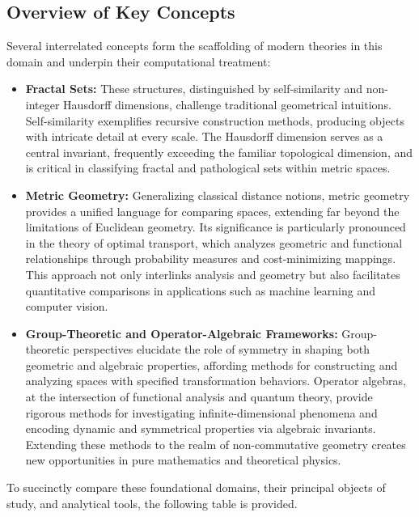 \documentclass[sigconf]{acmart}
\begin{document}
\subsection{Overview of Key Concepts}

Several interrelated concepts form the scaffolding of modern theories in this domain and underpin their computational treatment:

\begin{itemize}
    \item \textbf{Fractal Sets:} These structures, distinguished by self-similarity and non-integer Hausdorff dimensions, challenge traditional geometrical intuitions. Self-similarity exemplifies recursive construction methods, producing objects with intricate detail at every scale. The Hausdorff dimension serves as a central invariant, frequently exceeding the familiar topological dimension, and is critical in classifying fractal and pathological sets within metric spaces.
    \item \textbf{Metric Geometry:} Generalizing classical distance notions, metric geometry provides a unified language for comparing spaces, extending far beyond the limitations of Euclidean geometry. Its significance is particularly pronounced in the theory of optimal transport, which analyzes geometric and functional relationships through probability measures and cost-minimizing mappings. This approach not only interlinks analysis and geometry but also facilitates quantitative comparisons in applications such as machine learning and computer vision.
    \item \textbf{Group-Theoretic and Operator-Algebraic Frameworks:} Group-theoretic perspectives elucidate the role of symmetry in shaping both geometric and algebraic properties, affording methods for constructing and analyzing spaces with specified transformation behaviors. Operator algebras, at the intersection of functional analysis and quantum theory, provide rigorous methods for investigating infinite-dimensional phenomena and encoding dynamic and symmetrical properties via algebraic invariants. Extending these methods to the realm of non-commutative geometry creates new opportunities in pure mathematics and theoretical physics.
\end{itemize}

To succinctly compare these foundational domains, their principal objects of study, and analytical tools, the following table is provided.
\end{document}
